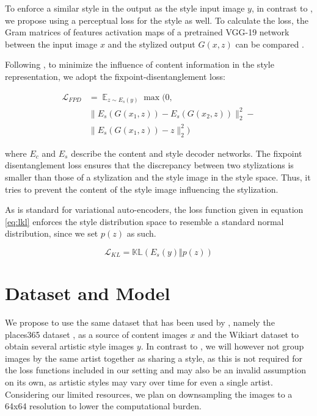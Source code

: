 \documentclass[twoside,twocolumn]{article}
\begin{document}
To enforce a similar style in the output as the style input image $y$, in contrast to \cite{Kotovenko_2019_ICCV}, we propose using a perceptual loss for the style as well. To calculate the loss, the Gram matrices of features activation maps of a pretrained VGG-19 network between the input image $x$ and the stylized output $G(x, z)$ can be compared \cite{johnson}.

Following \cite{Kotovenko_2019_ICCV}, to minimize the influence of content information in the style representation, we adopt the fixpoint-disentanglement loss:

\begin{equation}
\begin{split}
\mathcal{L}_{FPD} & = \mathop{\mathbb{E}}_{z \sim E_s(y)} \max(0, \\ & 
\lVert E_s(G(x_1, z)) - E_s(G(x_2, z))\rVert^2_2 - \\ &
\lVert E_s(G(x_1, z)) - z \rVert^2_2)
\end{split}
\label{eq:lfdp}
\end{equation}


where $E_c$ and $E_s$ describe the content and style decoder networks. The fixpoint disentanglement loss ensures that the discrepancy between two stylizations is smaller than those of a stylization and the style image in the style space. Thus, it tries to prevent the content of the style image influencing the stylization.

As is standard for variational auto-encoders, the loss function given in equation \eqref{eq:lkl} enforces the style distribution space to resemble a standard normal distribution, since we set $p(z)$ as such.


\begin{equation}
\mathcal{L}_{KL} = \mathbb{KL}(E_s(y) \Vert p(z))
\label{eq:lkl}
\end{equation}

\section{Dataset and Model}

We propose to use the same dataset that has been used by \cite{Kotovenko_2019_ICCV}, namely the places365 dataset \cite{places365}, as a source of content images $x$ and the Wikiart dataset \cite{wikiart} to obtain several artistic style images $y$. In contrast to \cite{Kotovenko_2019_ICCV}, we will however not group images by the same artist together as sharing a style, as this is not required for the loss functions included in our setting and may also be an invalid assumption on its own, as artistic styles may vary over time for even a single artist. Considering our limited resources, we plan on downsampling the images to a 64x64 resolution to lower the computational burden.
\end{document}

